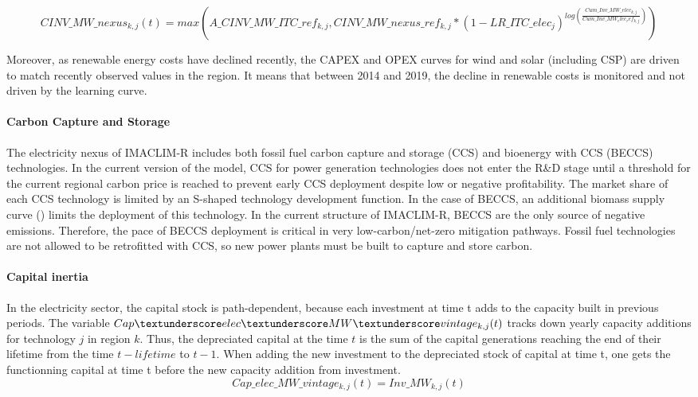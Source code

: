 \begin{dmath}
    CINV\_MW\_nexus_{k,j}(t) = max(A\_CINV\_MW\_ITC\_ref_{k,j},CINV\_MW\_nexus \_ref_{k,j}*(1-LR\_ ITC\_elec_{j})^{log(\frac{Cum\_Inv\_MW\_elec_{k,j}}{Cum\_Inv\_MW_elec_ ref_{k,j}})})
    \label{eqn:LR}
\end{dmath}

Moreover, as renewable energy costs have declined recently, the CAPEX and OPEX curves for wind and solar (including CSP) are driven to match recently observed values in the region. It means that between 2014 and 2019, the decline in renewable costs is monitored and not driven by the learning curve.

\paragraph{ Carbon Capture and Storage }
The electricity nexus of IMACLIM-R includes both fossil fuel carbon capture and storage (CCS) and bioenergy with CCS (BECCS) technologies. In the current version of the model, CCS for power generation technologies does not enter the R\&D stage until a threshold for the current regional carbon price is reached to prevent early CCS deployment despite low or negative profitability. The market share of each CCS technology is limited by an S-shaped technology development function. In the case of BECCS, an additional biomass supply curve (\cite{Hoogwijk2009}) limits the deployment of this technology. In the current structure of IMACLIM-R, BECCS are the only source of negative emissions. Therefore, the pace of BECCS deployment is critical in very low-carbon/net-zero mitigation pathways. Fossil fuel technologies are not allowed to be retrofitted with CCS, so new power plants must be built to capture and store carbon.


\paragraph{ Capital inertia }
In the electricity sector, the capital stock is path-dependent, because each investment at time t adds to the capacity built in previous periods. The variable $Cap\textunderscore elec\textunderscore MW\textunderscore vintage_{k,j}(t)$ tracks down yearly capacity additions for technology $j$ in region $k$. Thus, the depreciated capital at the time $t$ is the sum of the capital generations reaching the end of their lifetime from the time $t - lifetime$ to $t - 1$. When adding the new investment to the depreciated stock of capital at time t, one gets the functionning capital at time t before the new capacity addition from investment.
\begin{dmath}
    Cap\_elec\_ MW\_vintage_{k,j}(t) = Inv\_MW_{k,j}(t)
    \label{eqn:Cap_elec_vintage}
\end{dmath}

